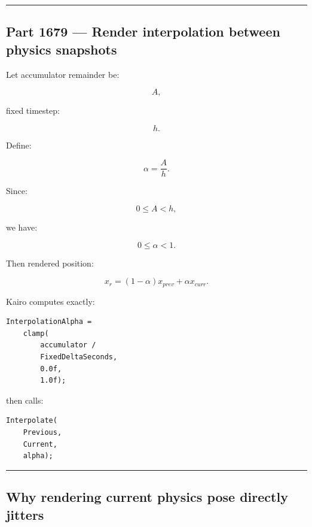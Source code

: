 \begin{center}\rule{0.5\linewidth}{0.5pt}\end{center}

\subsection{Part 1679 --- Render interpolation between physics snapshots}\label{06-engine-ii-ch037-part-1679-render-interpolation-between-physics-snapshots}

\hypertarget{06-engine-ii-ch037-part-1679-render-interpolation-between-physics-snapshots}{}

Let accumulator remainder be:

\[
A,
\]

fixed timestep:

\[
h.
\]

Define:

\[
\boxed{
\alpha
=
\frac{A}{h}.
}
\]

Since:

\[
0\le A<h,
\]

we have:

\[
0\le\alpha<1.
\]

Then rendered position:

\[
\boxed{
x_r
=
(1-\alpha)x_{prev}
+
\alpha x_{curr}.
}
\]

Kairo computes exactly:

\begin{verbatim}
InterpolationAlpha =
    clamp(
        accumulator /
        FixedDeltaSeconds,
        0.0f,
        1.0f);
\end{verbatim}

then calls:

\begin{verbatim}
Interpolate(
    Previous,
    Current,
    alpha);
\end{verbatim}

\begin{center}\rule{0.5\linewidth}{0.5pt}\end{center}

\subsection{Why rendering current physics pose directly jitters}\label{06-engine-ii-ch037-why-rendering-current-physics-pose-directly-jitters}

\hypertarget{06-engine-ii-ch037-why-rendering-current-physics-pose-directly-jitters}{}

